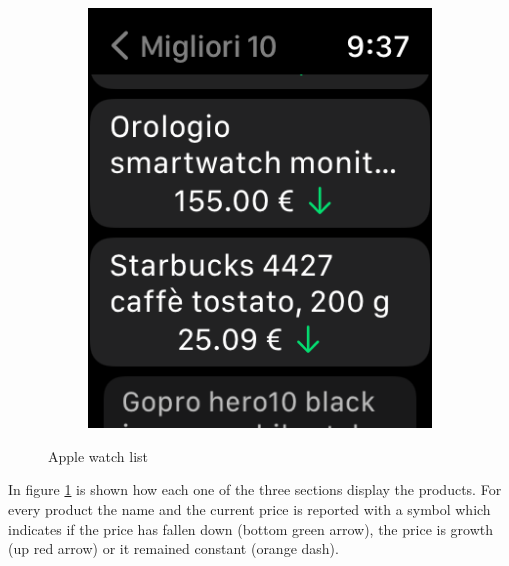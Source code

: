 \begin{figure}[h!]
\begin{subfigure}[b]{0.3\textwidth}
            \includegraphics[width=\textwidth]{images/interfaces/watch_list_2.png}
        \end{subfigure}
         \caption{Apple watch list}
        \label{fig:watch_list}
\end{figure}
\FloatBarrier
In figure \ref{fig:watch_list} is shown how each one of the three sections display the products. For every product the name and the current price is reported with a symbol which indicates if the price has fallen down (bottom green arrow), the price is growth (up red arrow) or it remained constant (orange dash).

